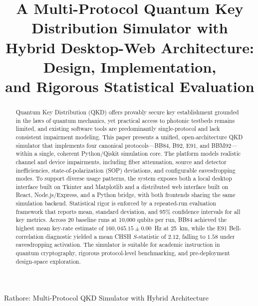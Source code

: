 \documentclass[journal]{IEEEtran}
\begin{document}

\title{A Multi-Protocol Quantum Key Distribution Simulator with\\
Hybrid Desktop-Web Architecture: Design, Implementation,\\
and Rigorous Statistical Evaluation}

\author{%
}

%
         {Rathore: Multi-Protocol QKD Simulator with Hybrid Architecture}

\maketitle

\begin{abstract}
Quantum Key Distribution (QKD) offers provably secure key establishment
grounded in the laws of quantum mechanics, yet practical access to
photonic testbeds remains limited, and existing software tools are
predominantly single-protocol and lack consistent impairment modeling.
This paper presents a unified, open-architecture QKD simulator that
implements four canonical protocols—BB84, B92, E91, and BBM92—within a
single, coherent Python/Qiskit simulation core. The platform models
realistic channel and device impairments, including fiber attenuation,
source and detector inefficiencies, state-of-polarization (SOP)
deviations, and configurable eavesdropping modes. To support diverse
usage patterns, the system exposes both a local desktop interface built
on Tkinter and Matplotlib and a distributed web interface built on
React, Node.js/Express, and a Python bridge, with both frontends sharing
the same simulation backend. Statistical rigor is enforced by a
repeated-run evaluation framework that reports mean, standard deviation,
and 95\% confidence intervals for all key metrics. Across 20 baseline
runs at 10,000 qubits per run, BB84 achieved the highest mean key-rate
estimate of $160{,}045.15 \pm 0.00$~Hz at 25~km, while the E91
Bell-correlation diagnostic yielded a mean CHSH $S$-statistic of
$2.12$, falling to $1.58$ under eavesdropping activation. The simulator
is suitable for academic instruction in quantum cryptography, rigorous
protocol-level benchmarking, and pre-deployment design-space
exploration.
\end{abstract}
\end{document}
